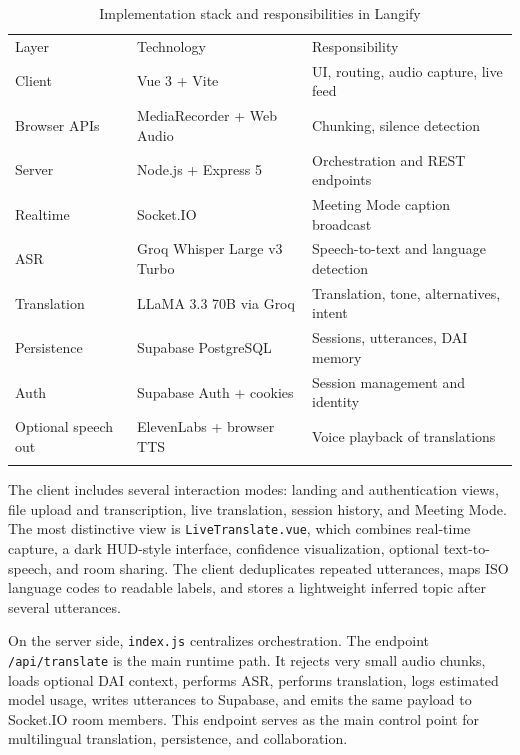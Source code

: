 \documentclass[twocolumn]{svjour3}
\begin{document}
\begin{table}
\caption{Implementation stack and responsibilities in Langify}
\label{tab:stack}
\centering
\small
\setlength{\tabcolsep}{3pt}
\begin{tabular}{>{\raggedright\arraybackslash}p{} >{\raggedright\arraybackslash}p{} >{\raggedright\arraybackslash}p{}}
\hline\noalign{\smallskip}
Layer & Technology & Responsibility \\
\noalign{\smallskip}\hline\noalign{\smallskip}
Client & Vue 3 + Vite & UI, routing, audio capture, live feed \\
Browser APIs & MediaRecorder + Web Audio & Chunking, silence detection \\
Server & Node.js + Express 5 & Orchestration and REST endpoints \\
Realtime & Socket.IO & Meeting Mode caption broadcast \\
ASR & Groq Whisper Large v3 Turbo & Speech-to-text and language detection \\
Translation & LLaMA 3.3 70B via Groq & Translation, tone, alternatives, intent \\
Persistence & Supabase PostgreSQL & Sessions, utterances, DAI memory \\
Auth & Supabase Auth + cookies & Session management and identity \\
Optional speech out & ElevenLabs + browser TTS & Voice playback of translations \\
\noalign{\smallskip}\hline
\end{tabular}
\end{table}

The client includes several interaction modes: landing and authentication views, file upload and transcription, live translation, session history, and Meeting Mode. The most distinctive view is \texttt{LiveTranslate.vue}, which combines real-time capture, a dark HUD-style interface, confidence visualization, optional text-to-speech, and room sharing. The client deduplicates repeated utterances, maps ISO language codes to readable labels, and stores a lightweight inferred topic after several utterances.

On the server side, \texttt{index.js} centralizes orchestration. The endpoint \mbox{\texttt{/api/translate}} is the main runtime path. It rejects very small audio chunks, loads optional DAI context, performs ASR, performs translation, logs estimated model usage, writes utterances to Supabase, and emits the same payload to Socket.IO room members. This endpoint serves as the main control point for multilingual translation, persistence, and collaboration.
\end{document}
